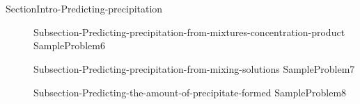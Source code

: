 \documentclass[main.tex]{subfiles}
\begin{document}
\section{\color{blue!30!black}{Predicting precipitation from mixtures and solutions}} {SectionIntro-Predicting-precipitation}
\sloppy\begin{description}
\item[] {Subsection-Predicting-precipitation-from-mixtures-concentration-product}
{SampleProblem6}
\item[] {Subsection-Predicting-precipitation-from-mixing-solutions}
{SampleProblem7}
\item[] {Subsection-Predicting-the-amount-of-precipitate-formed}
{SampleProblem8}
\end{description}



\checkoddpage\ifoddpage \clearpage\thispagestyle{empty}\mbox{}\clearpage \else  \fi 
\end{document}
